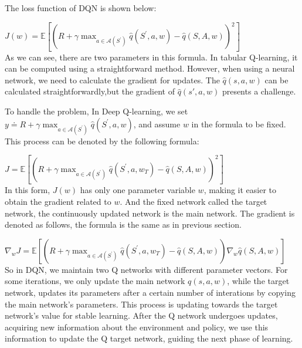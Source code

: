 \documentclass{article}
\begin{document}
The loss function of DQN is shown below:

\hspace*{\fill}

$J(w)=\mathbb{E}\left[\left(R+\gamma \max _{a \in \mathcal{A}\left(S^{\prime}\right)} \hat{q}\left(S^{\prime}, a, w\right)-\hat{q}(S, A, w)\right)^2\right]$\\


As we can see, there are two parameters in this formula. In tabular Q-learning, it can be computed using a straightforward method. However, when using a neural network, we need to calculate the gradient for updates. The $\hat{q}(s,a,w)$ can be calculated straightforwardly,but the gradient of $\hat{q}(s',a,w)$ presents a challenge.

To handle the problem, In Deep Q-learning, we set $y \doteq R+\gamma \max _{a \in \mathcal{A}\left(S^{\prime}\right)} \hat{q}\left(S^{\prime}, a, w\right)$, and assume $w$ in the formula to be fixed. This process can be denoted by the following formula:

\hspace*{\fill}

$J=\mathbb{E}\left[\left(R+\gamma \max _{a \in \mathcal{A}\left(S^{\prime}\right)} \hat{q}\left(S^{\prime}, a, w_T\right)-\hat{q}(S, A, w)\right)^2\right]$\\

In this form, $J(w)$ has only one parameter variable $w$, making it easier to obtain the gradient related to $w$. And the fixed network called the target network, the continuously updated network is the main network. The gradient is denoted as follows, the formula is the same as in previous section.

\hspace*{\fill}

$\nabla_w J=\mathbb{E}\left[\left(R+\gamma \max _{a \in \mathcal{A}\left(S^{\prime}\right)} \hat{q}\left(S^{\prime}, a, w_T\right)-\hat{q}(S, A, w)\right) \nabla_w \hat{q}(S, A, w)\right]$\\

So in DQN, we maintain two Q networks with different parameter vectors. For some iterations, we only update the main network $q(s,a,w)$, while the target network, updates its parameters after a certain number of interations by copying the main network's parameters. This process is updating towards the target network's value for stable learning. After the Q network undergoes updates, acquiring new information about the environment and policy, we use this information to update the Q target network, guiding the next phase of learning.
\end{document}
